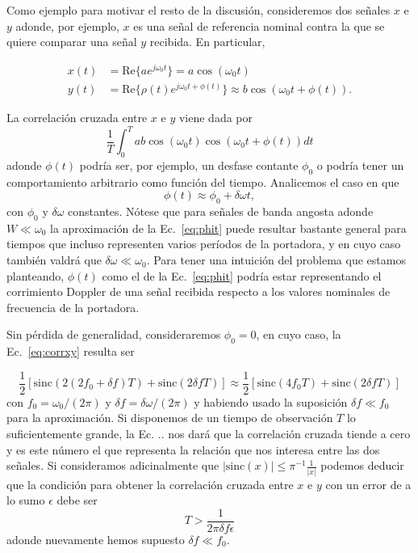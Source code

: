 \documentclass{article}
\begin{document}
Como ejemplo para motivar el resto de la discusión, consideremos dos señales $x$ e $y$ adonde, por ejemplo, $x$ es una señal de referencia nominal contra la que se quiere comparar una señal $y$ recibida. En particular,

\begin{align*}
    x(t) &= \mbox{Re} \{a e^{j \omega_0 t}\} = a \cos(\omega_0 t)\\
    y(t) &= \mbox{Re} \{\rho(t) e^{j \omega_0 t + \phi(t)} \} \approx b \cos(\omega_0 t + \phi(t)). 
\end{align*}

La correlación cruzada entre $x$ e $y$ viene dada por
\begin{equation}\label{eq:corrxy}
    \frac{1}{T} \int_0^T a b \cos(\omega_0 t) \cos(\omega_0 t + \phi(t)) dt
\end{equation}
adonde $\phi(t)$ podría ser, por ejemplo, un desfase contante $\phi_0$ o podría tener un comportamiento arbitrario como función del tiempo. Analicemos el caso en que 
\begin{equation}\label{eq:phit}
\phi(t) \approx \phi_0 + \delta \omega t,    
\end{equation}
con $\phi_0$ y $\delta \omega$ constantes. Nótese que para señales de banda angosta adonde $W \ll \omega_0$ la aproximación de la Ec.~\ref{eq:phit} puede resultar bastante general para tiempos que incluso representen varios períodos de la portadora, y en cuyo caso también valdrá que $\delta \omega \ll \omega_0$. Para tener una intuición del problema que estamos planteando, $\phi(t)$ como el de la Ec.~\ref{eq:phit} podría estar representando el corrimiento Doppler de una señal recibida respecto a los valores nominales de frecuencia de la portadora.

Sin pérdida de generalidad, consideraremos $\phi_0=0$, en cuyo caso, la Ec.~\ref{eq:corrxy} resulta ser

\begin{equation}\label{eq:corrxyphilin}
     \frac{1}{2} \left[\mathrm{sinc}(2(2 f_0 + \delta\!f)T) + \mathrm{sinc}(2 \delta\!f T)\right] \approx \frac{1}{2} \left[\mathrm{sinc}(4 f_0 T) + \mathrm{sinc}(2 \delta\!f T)\right] 
\end{equation}
con $f_0=\omega_0/(2 \pi)$ y $\delta\!f = \delta \omega /(2 \pi)$ y habiendo usado la suposición $\delta\!f \ll f_0$ para la aproximación.
Si disponemos de un tiempo de observación $T$ lo suficientemente grande, la Ec. .. nos dará que la correlación cruzada tiende a cero y es este número el que representa la relación que nos interesa entre las dos señales. Si consideramos adicinalmente que $|\mathrm{sinc}(x)|\leq \pi^{-1} \frac{1}{|x|}$ podemos deducir que la condición para obtener la correlación cruzada entre $x$ e $y$ con un error de a lo sumo $\epsilon$ debe ser
\begin{equation}\label{eq:cotaT}
    T > \frac{1}{2 \pi \delta\!f \epsilon}
\end{equation}
adonde nuevamente hemos supuesto $\delta\!f \ll f_0$.
\end{document}
